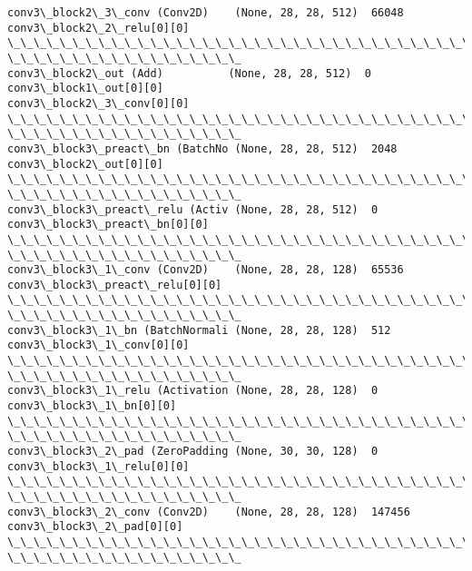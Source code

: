 \documentclass[11pt]{article}
\begin{document}
\begin{Verbatim}[commandchars=\\\{\}]
conv3\_block2\_3\_conv (Conv2D)    (None, 28, 28, 512)  66048
conv3\_block2\_2\_relu[0][0]
\_\_\_\_\_\_\_\_\_\_\_\_\_\_\_\_\_\_\_\_\_\_\_\_\_\_\_\_\_\_\_\_\_\_\_\_\_\_\_\_\_\_\_\_\_\_\_\_\_\_\_\_\_\_\_\_\_\_\_\_\_\_\_\_\_\_\_\_\_\_\_\_\_\_\_\_\_\_\_\_
\_\_\_\_\_\_\_\_\_\_\_\_\_\_\_\_\_\_
conv3\_block2\_out (Add)          (None, 28, 28, 512)  0
conv3\_block1\_out[0][0]
conv3\_block2\_3\_conv[0][0]
\_\_\_\_\_\_\_\_\_\_\_\_\_\_\_\_\_\_\_\_\_\_\_\_\_\_\_\_\_\_\_\_\_\_\_\_\_\_\_\_\_\_\_\_\_\_\_\_\_\_\_\_\_\_\_\_\_\_\_\_\_\_\_\_\_\_\_\_\_\_\_\_\_\_\_\_\_\_\_\_
\_\_\_\_\_\_\_\_\_\_\_\_\_\_\_\_\_\_
conv3\_block3\_preact\_bn (BatchNo (None, 28, 28, 512)  2048
conv3\_block2\_out[0][0]
\_\_\_\_\_\_\_\_\_\_\_\_\_\_\_\_\_\_\_\_\_\_\_\_\_\_\_\_\_\_\_\_\_\_\_\_\_\_\_\_\_\_\_\_\_\_\_\_\_\_\_\_\_\_\_\_\_\_\_\_\_\_\_\_\_\_\_\_\_\_\_\_\_\_\_\_\_\_\_\_
\_\_\_\_\_\_\_\_\_\_\_\_\_\_\_\_\_\_
conv3\_block3\_preact\_relu (Activ (None, 28, 28, 512)  0
conv3\_block3\_preact\_bn[0][0]
\_\_\_\_\_\_\_\_\_\_\_\_\_\_\_\_\_\_\_\_\_\_\_\_\_\_\_\_\_\_\_\_\_\_\_\_\_\_\_\_\_\_\_\_\_\_\_\_\_\_\_\_\_\_\_\_\_\_\_\_\_\_\_\_\_\_\_\_\_\_\_\_\_\_\_\_\_\_\_\_
\_\_\_\_\_\_\_\_\_\_\_\_\_\_\_\_\_\_
conv3\_block3\_1\_conv (Conv2D)    (None, 28, 28, 128)  65536
conv3\_block3\_preact\_relu[0][0]
\_\_\_\_\_\_\_\_\_\_\_\_\_\_\_\_\_\_\_\_\_\_\_\_\_\_\_\_\_\_\_\_\_\_\_\_\_\_\_\_\_\_\_\_\_\_\_\_\_\_\_\_\_\_\_\_\_\_\_\_\_\_\_\_\_\_\_\_\_\_\_\_\_\_\_\_\_\_\_\_
\_\_\_\_\_\_\_\_\_\_\_\_\_\_\_\_\_\_
conv3\_block3\_1\_bn (BatchNormali (None, 28, 28, 128)  512
conv3\_block3\_1\_conv[0][0]
\_\_\_\_\_\_\_\_\_\_\_\_\_\_\_\_\_\_\_\_\_\_\_\_\_\_\_\_\_\_\_\_\_\_\_\_\_\_\_\_\_\_\_\_\_\_\_\_\_\_\_\_\_\_\_\_\_\_\_\_\_\_\_\_\_\_\_\_\_\_\_\_\_\_\_\_\_\_\_\_
\_\_\_\_\_\_\_\_\_\_\_\_\_\_\_\_\_\_
conv3\_block3\_1\_relu (Activation (None, 28, 28, 128)  0
conv3\_block3\_1\_bn[0][0]
\_\_\_\_\_\_\_\_\_\_\_\_\_\_\_\_\_\_\_\_\_\_\_\_\_\_\_\_\_\_\_\_\_\_\_\_\_\_\_\_\_\_\_\_\_\_\_\_\_\_\_\_\_\_\_\_\_\_\_\_\_\_\_\_\_\_\_\_\_\_\_\_\_\_\_\_\_\_\_\_
\_\_\_\_\_\_\_\_\_\_\_\_\_\_\_\_\_\_
conv3\_block3\_2\_pad (ZeroPadding (None, 30, 30, 128)  0
conv3\_block3\_1\_relu[0][0]
\_\_\_\_\_\_\_\_\_\_\_\_\_\_\_\_\_\_\_\_\_\_\_\_\_\_\_\_\_\_\_\_\_\_\_\_\_\_\_\_\_\_\_\_\_\_\_\_\_\_\_\_\_\_\_\_\_\_\_\_\_\_\_\_\_\_\_\_\_\_\_\_\_\_\_\_\_\_\_\_
\_\_\_\_\_\_\_\_\_\_\_\_\_\_\_\_\_\_
conv3\_block3\_2\_conv (Conv2D)    (None, 28, 28, 128)  147456
conv3\_block3\_2\_pad[0][0]
\_\_\_\_\_\_\_\_\_\_\_\_\_\_\_\_\_\_\_\_\_\_\_\_\_\_\_\_\_\_\_\_\_\_\_\_\_\_\_\_\_\_\_\_\_\_\_\_\_\_\_\_\_\_\_\_\_\_\_\_\_\_\_\_\_\_\_\_\_\_\_\_\_\_\_\_\_\_\_\_
\_\_\_\_\_\_\_\_\_\_\_\_\_\_\_\_\_\_

\end{Verbatim}
\end{document}
